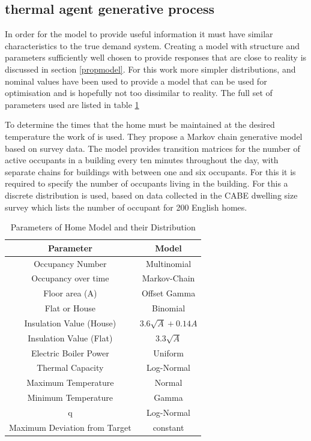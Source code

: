 \documentclass[a4paper, 10 pt, conference]{ieeeconf}  %
\begin{document}
\subsection{thermal agent generative process}
In order for the model to provide useful information it must have similar characteristics to the true demand system. Creating a model with structure and parameters sufficiently well chosen to provide responses that are close to reality is discussed in section \ref{propmodel}. For this work more simpler distributions, and nominal values have been used to provide a model that can be used for optimisation and is hopefully not too dissimilar to reality. The full set of parameters used are listed in table \ref{modelpara}

To determine the times that the home must be maintained at the desired temperature the work of \cite{richardson2008high} is used. They propose a Markov chain generative model based on survey data. The model provides transition matrices for the number of active occupants in a building every ten minutes throughout the day, with separate chains for buildings with between one and six occupants. For this it is required to specify the number of occupants living in the building. For this a discrete distribution is used, based on data collected in the CABE dwelling size survey \cite{CABE} which lists the number of occupant for 200 English homes.

\begin{table}[h]
\caption{Parameters of Home Model and their Distribution}
\label{modelpara}
\begin{center}
\begin{tabular}{|c||c|}
\hline
Parameter & Model\\
\hline \hline
Occupancy Number & Multinomial \\
\hline
Occupancy over time & Markov-Chain \\
\hline
Floor area (A) & Offset Gamma \\
\hline
Flat or House & Binomial  \\
\hline
Insulation Value (House) & $3.6\sqrt{A}+0.14A$\\
\hline
Insulation Value (Flat) & $3.3\sqrt{A}$\\
\hline
Electric Boiler Power & Uniform\\
\hline
Thermal Capacity & Log-Normal  \\
\hline
Maximum Temperature & Normal \\
\hline
Minimum Temperature & Gamma \\
\hline
q & Log-Normal \\
\hline
Maximum Deviation from Target & constant \\
\hline
\end{tabular}
\end{center}
\end{table}
\end{document}
